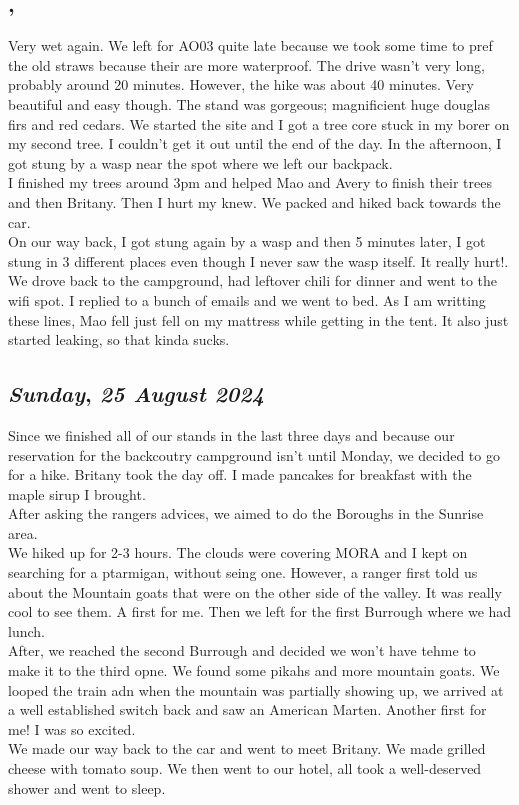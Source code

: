 \subsection*{\weekday, \day}
Very wet again. We left for AO03 quite late because we took some time to pref the old straws because their are more waterproof. The drive wasn't very long, probably around 20 minutes. However, the hike was about 40 minutes. Very beautiful and easy though. The stand was gorgeous; magnificient huge douglas firs and red cedars. We started the site and I got a tree core stuck in my borer on my second tree. I couldn't get it out until the end of the day. In the afternoon, I got stung by a wasp near the spot where we left our backpack.\\
I finished my trees around 3pm and helped Mao and Avery to finish their trees and then Britany. Then I hurt my knew. We packed and hiked back towards the car. \\
On our way back, I got stung again by a wasp and then 5 minutes later, I got stung in 3 different places even though I never saw the wasp itself. It really hurt!. \\
We drove back to the campground, had leftover chili for dinner and went to the wifi spot. I replied to a bunch of emails and we went to bed. As I am writting these lines, Mao fell just fell on my mattress while getting in the tent. It also just started leaking, so that kinda sucks.

\def\day{\textit{25 August 2024}}
\def\weekday{\textit{Sunday}}
\subsection*{\weekday, \day}
Since we finished all of our stands in the last three days and because our reservation for the backcoutry campground isn't until Monday, we decided to go for a hike. Britany took the day off. I made pancakes for breakfast with the maple sirup I brought.  \\
After asking the rangers advices, we aimed to do the Boroughs in the Sunrise area. \\
We hiked up for 2-3 hours. The clouds were covering MORA and I kept on searching for a ptarmigan, without seing one. However, a ranger first told us about the Mountain goats that were on the other side of the valley. It was really cool to see them. A first for me. Then we left for the first Burrough where we had lunch.\\
After, we reached the second Burrough and decided we won't have tehme to make it to the third opne. We found some pikahs and more mountain goats. We looped the train adn when the mountain was partially showing up, we arrived at a well established switch back and saw an American Marten. Another first for me! I was so excited. \\
We made our way back to the car and went to meet Britany. We made grilled cheese with tomato soup. We then went to our hotel, all took a well-deserved shower and went to sleep. 
\def\day{\textit{26 August 2024}}
\def\weekday{\textit{Monday}}

